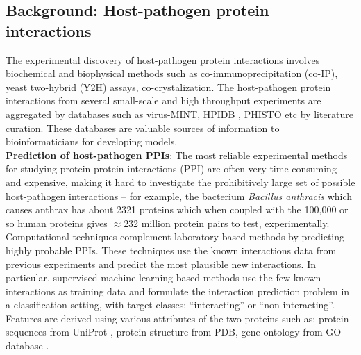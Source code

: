 \documentclass{bioinfo}
\begin{document}
\subsection{Background: Host-pathogen protein interactions}
The experimental discovery of host-pathogen protein interactions involves biochemical and biophysical methods such as co-immunoprecipitation (co-IP), yeast two-hybrid (Y2H) assays, co-crystalization. The host-pathogen protein interactions from several small-scale and high throughput experiments are aggregated by databases such as virus-MINT\cite{virusmint}, HPIDB \cite{hpidb}, PHISTO \cite{phisto} etc by literature curation. These databases are valuable sources of information to bioinformaticians for developing models. \\

\noindent\textbf{Prediction of host-pathogen PPIs}: The most reliable experimental methods for studying protein-protein interactions (PPI) are often very time-consuming and expensive, making it hard to investigate the prohibitively large set of possible host-pathogen interactions -- for example, the bacterium \textit{Bacillus anthracis} which causes anthrax has about 2321 proteins which when coupled with the 100,000 or so human proteins gives $\approx$232 million protein pairs to test, experimentally. Computational techniques complement laboratory-based methods by predicting highly probable PPIs. These techniques use the known interactions data from previous experiments and predict the most plausible new interactions. In particular, supervised machine learning based methods use the few known interactions as training data and formulate the interaction prediction problem in a classification setting, with target classes: ``interacting'' or ``non-interacting''. Features are derived using various attributes of the two proteins such as: protein sequences from UniProt \cite{UniProt}, protein structure from PDB, gene ontology from GO database \cite{GO}.
\end{document}
